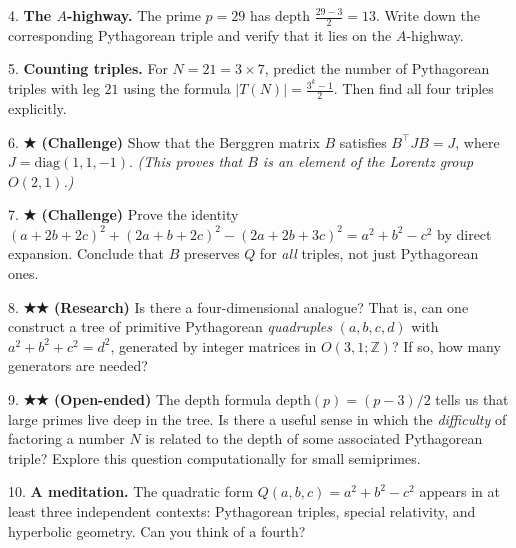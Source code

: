 4. \textbf{The $A$-highway.} The prime $p = 29$ has depth $\frac{29 - 3}{2} = 13$. Write down the corresponding Pythagorean triple and verify that it lies on the $A$-highway.

5. \textbf{Counting triples.} For $N = 21 = 3 \times 7$, predict the number of Pythagorean triples with leg $21$ using the formula $|T(N)| = \frac{3^k - 1}{2}$. Then find all four triples explicitly.

6. \textbf{★ (Challenge)} Show that the Berggren matrix $B$ satisfies $B^\top J B = J$, where $J = \text{diag}(1, 1, -1)$. \textit{(This proves that $B$ is an element of the Lorentz group $O(2,1)$.)}

7. \textbf{★ (Challenge)} Prove the identity $(a + 2b + 2c)^2 + (2a + b + 2c)^2 - (2a + 2b + 3c)^2 = a^2 + b^2 - c^2$ by direct expansion. Conclude that $B$ preserves $Q$ for \textit{all} triples, not just Pythagorean ones.

8. \textbf{★★ (Research)} Is there a four-dimensional analogue? That is, can one construct a tree of primitive Pythagorean \textit{quadruples} $(a, b, c, d)$ with $a^2 + b^2 + c^2 = d^2$, generated by integer matrices in $O(3,1; \mathbb{Z})$? If so, how many generators are needed?

9. \textbf{★★ (Open-ended)} The depth formula $\text{depth}(p) = (p-3)/2$ tells us that large primes live deep in the tree. Is there a useful sense in which the \textit{difficulty} of factoring a number $N$ is related to the depth of some associated Pythagorean triple? Explore this question computationally for small semiprimes.

10. \textbf{A meditation.} The quadratic form $Q(a, b, c) = a^2 + b^2 - c^2$ appears in at least three independent contexts: Pythagorean triples, special relativity, and hyperbolic geometry. Can you think of a fourth?
